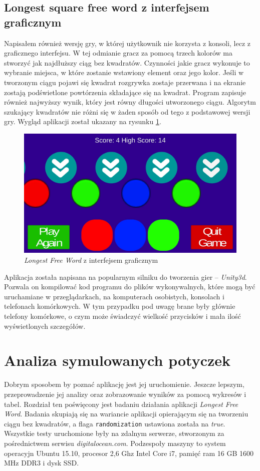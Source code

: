 \documentclass[document]{xmgr}
\begin{document}
\section{Longest square free word z interfejsem graficznym}
Napisałem również wersję gry, w której użytkownik nie korzysta z konsoli, lecz z graficznego interfejsu. W tej odmianie gracz za pomocą trzech kolorów ma stworzyć jak najdłuższy ciąg bez kwadratów. Czynności jakie gracz wykonuje to wybranie miejsca, w które zostanie wstawiony element oraz jego kolor. Jeśli w tworzonym ciągu pojawi się kwadrat rozgrywka zostaje przerwana i na ekranie zostają podświetlone powtórzenia składające się na kwadrat. Program zapisuje również najwyższy wynik, który jest równy długości utworzonego ciągu. Algorytm szukający kwadratów nie różni się w żaden sposób od tego z podstawowej wersji gry. Wygląd aplikacji został ukazany na rysunku \ref{fig:thueMobile}.

\begin{figure}[tbh]
    \centering
    \includegraphics[width = \textwidth]{images/thueMobile}
    \caption{\emph{Longest Free Word} z interfejsem graficznym}
    \label{fig:thueMobile}
\end{figure}

Aplikacja została napisana na popularnym silniku do tworzenia gier -- \emph{Unity3d}. Pozwala on kompilować kod programu do plików wykonywalnych, które mogą być uruchamiane w przeglądarkach, na komputerach osobistych, konsolach i telefonach komórkowych. W tym przypadku pod uwagę brane były głównie telefony komórkowe, o czym może świadczyć wielkość przycisków i mała ilość wyświetlonych szczegółów.


\chapter{Analiza symulowanych potyczek} 
Dobrym sposobem by poznać aplikację jest jej uruchomienie. Jeszcze lepszym, przeprowadzenie jej analizy oraz zobrazowanie wyników za pomocą wykresów i tabel. Rozdział ten poświęcony jest badaniu działania aplikacji \emph{Longest Free Word}. Badania skupiają się na wariancie aplikacji opierającym się na tworzeniu ciągu bez kwadratów, a flaga \texttt{randomization} ustawiona została na \textit{true}. Wszystkie testy uruchomione były na zdalnym serwerze, stworzonym za pośrednictwem serwisu \emph{digitalocean.com}. Podzespoły maszyny to system operacyjn Ubuntu 15.10, procesor 2,6 Ghz Intel Core i7, pamięć ram 16 GB 1600 MHz DDR3 i dysk SSD.
\end{document}
